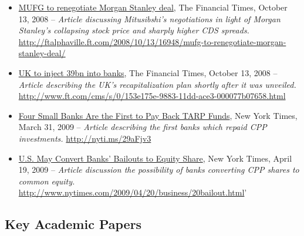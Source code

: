 \documentclass[12pt]{article}
\begin{document}
\begin{itemize}
\item
\ul{MUFG to renegotiate Morgan Stanley deal}, The Financial Times, October 13,
 2008 -- \emph{Article discussing Mitusibshi's negotiations in light of Morgan Stanley's collapsing stock price and sharply higher CDS spreads.} \url{http://ftalphaville.ft.com/2008/10/13/16948/mufg-to-renegotiate-morgan-stanley-deal/}
 
\item
\ul{UK to inject \textsterling 39bn into banks}, The Financial Times, October 13,
 2008 -- \emph{Article describing the UK's recapitalization plan shortly after it was unveiled.} \url{http://www.ft.com/cms/s/0/153e175e-9883-11dd-ace3-000077b07658.html}
  \item
\ul{Four Small Banks Are the First to Pay Back TARP Funds}, New York Times, March 31,
 2009 -- \emph{Article describing the first banks which repaid CPP investments.} \url{http://nyti.ms/29aFjv3} 
\item
\ul{U.S. May Convert Banks' Bailouts to Equity Share}, New York Times, April 19,
 2009 -- \emph{Article discussion the possibility of banks converting CPP shares to common equity.} \url{http://www.nytimes.com/2009/04/20/business/20bailout.html}'
 
\end{itemize}

\subsection{Key Academic Papers}
\end{document}
